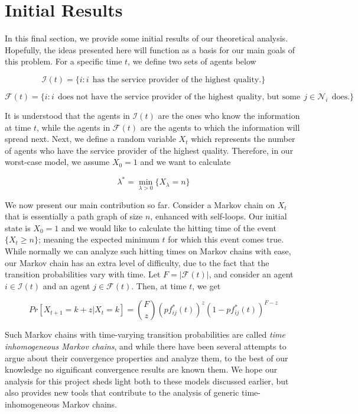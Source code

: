 \documentclass[format=acmsmall, review=false]{acmart}
\begin{document}
\section{Initial Results}

\par In this final section, we provide some initial results of our theoretical analysis. Hopefully, the ideas presented
here will function as a basis for our main goals of this problem. For a specific time $t$, we define two sets of agents below

\[
\mathcal{I}(t) = \{ i : i \: \: \text{has the service provider of the highest quality.} \}
\]

\[
\mathcal{F}(t) = \{ i : i \: \: \text{does not have the service provider of the highest quality, but some} \: \: j \in \mathcal{N}_i \: \: \text{does.} \}
\]

\par It is understood that the agents in $\mathcal{I}(t)$ are the ones who know the information at time $t$, while the agents
in $\mathcal{F}(t)$ are the agents to which the information will spread next. Next, we define a random variable $X_t$ which
represents the number of agents who have the service provider of the highest quality. Therefore, in our worst-case model, we
assume $X_0 = 1$ and we want to calculate

\[
\lambda^* = \min_{\lambda > 0} { \{ X_\lambda = n \} }
\]

\par We now present our main contribution so far. Consider a Markov chain on $X_t$ that is essentially a path graph of size $n$,
enhanced with self-loops. Our initial state is $X_0 = 1$ and we would like to calculate the hitting time of the event
$\{ X_t \geq n \}$; meaning the expected minimum $t$ for which this event comes true. While normally we can analyze such
hitting times on Markov chains with ease, our Markov chain has an extra level of difficulty, due to the fact that the transition
probabilities vary with time. Let $F = |\mathcal{F}(t)|$, and consider an agent $i \in \mathcal{I}(t)$ and an agent
$j \in \mathcal{F}(t)$. Then, at time $t$, we get

\[
Pr[X_{t+1} = k + z | X_t = k] = \binom{F}{z} { \left( p f^*_{ij}(t) \right) }^z { \left( 1 - p f^*_{ij}(t) \right) }^{F-z}
\]

\par Such Markov chains with time-varying transition probabilities are called \textit{time inhomogeneous Markov chains}, and
while there have been several attempts to argue about their convergence properties and analyze them, to the best of our
knowledge no significant convergence results are known them. We hope our analysis for this project sheds light both to
these models discussed earlier, but also provides new tools that contribute to the analysis of generic time-inhomogeneous
Markov chains.
\end{document}

